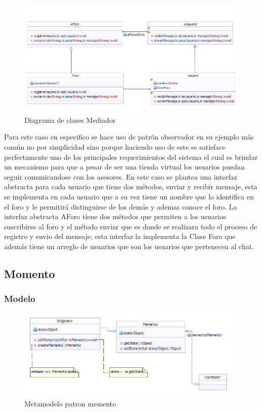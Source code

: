 \begin{figure}[th!]
	\centering
	\includegraphics[width=1\linewidth]{arquitectura/imagenes/DiagramaMediator}
	\caption{Diagrama de clases Mediador}
\end{figure}

Para este caso en especifico se hace uso de patrón observador en su ejemplo más común no por simplicidad sino porque haciendo uso de este se satisface perfectamente uno de los principales requerimientos del sistema el cual es brindar un mecanismo para que a pesar de ser una tienda virtual los usuarios puedan seguir comunicandose con los asesores. \newline
En este caso se plantea una interfaz abstracta para cada usuario que tiene dos métodos, enviar y recibir mensaje, esta se implementa en cada usuario que a su vez tiene un nombre que lo identifica en el foro y le permitirá distinguirse de los demás y ademas conoce el foro. La interfaz abstracta AForo tiene dos métodos que permiten a los usuarios suscribirse al foro y el método enviar que es donde se realizara todo el proceso de registro y envio del mensaje, esta interfaz la implementa la Clase Foro que además tiene un arreglo de usuarios que son los usuarios que pertenecen al chat.



\subsection{Momento}
\subsubsection{Modelo}
\begin{figure}[th!]
	\centering
	\includegraphics[width=0.9\linewidth]{arquitectura/imagenes/PatronMemento}
	\caption{Metamodelo patron memento}
	\label{fig:Metamodelo patron memento}
\end{figure}

